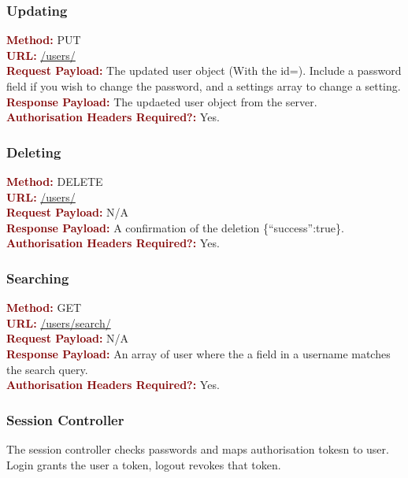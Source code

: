 \documentclass[11pt,a4paper]{report}
\begin{document}
\subsubsection{Updating}
\textbf{\textcolor{Maroon}{Method:}} PUT\\
\textbf{\textcolor{Maroon}{URL:}} \url{/users/}\\
\textbf{\textcolor{Maroon}{Request Payload:}} The updated user object (With the id=). Include a password field if you wish to change the password, and a settings array to change a setting.\\
\textbf{\textcolor{Maroon}{Response Payload:}} The updaeted user object from the server.\\
\textbf{\textcolor{Maroon}{Authorisation Headers Required?:}} Yes.

\subsubsection{Deleting}
\textbf{\textcolor{Maroon}{Method:}} DELETE\\
\textbf{\textcolor{Maroon}{URL:}} \url{/users/}\\
\textbf{\textcolor{Maroon}{Request Payload:}} N/A\\
\textbf{\textcolor{Maroon}{Response Payload:}} A confirmation of the deletion \{``success'':true\}.\\
\textbf{\textcolor{Maroon}{Authorisation Headers Required?:}} Yes.

\subsubsection{Searching}
\textbf{\textcolor{Maroon}{Method:}} GET\\
\textbf{\textcolor{Maroon}{URL:}} \url{/users/search/}\\
\textbf{\textcolor{Maroon}{Request Payload:}} N/A\\
\textbf{\textcolor{Maroon}{Response Payload:}} An array of user where the a field in a username matches the search query.\\
\textbf{\textcolor{Maroon}{Authorisation Headers Required?:}} Yes.

\subsubsection{Session Controller}

The session controller checks passwords and maps authorisation tokesn to user. Login grants the user a token, logout revokes that token. 
\end{document}
